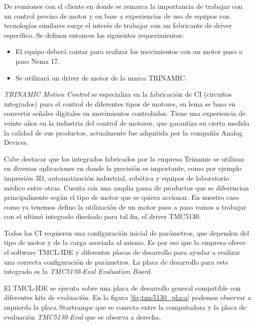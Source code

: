 De reuniones con el cliente en donde se remarca la importancia de trabajar con un control preciso de motor y en base a experiencias de uso de equipos con tecnologías similares surge el interés de trabajar con un fabricante de driver específico. Se definen entonces los siguientes requerimientos:
			
\begin{itemize}
\item El equipo deberá contar para realizar los movimientos con un motor paso a paso Nema 17.
\item Se utilizará un driver de motor de la marca TRINAMIC.
\end{itemize}

\textit{TRINAMIC Motion Control} \citep{3_web_trinamic} se especializa en la fabricación de CI (circuitos integrados) para el control de diferentes tipos de motores, su lema se basa en convertir señales digitales en movimientos controlados. Tiene una experiencia de veinte años en la industria del control de motores, que garantiza en cierta medida la calidad de sus productos, actualmente fue adquirida por la compañía Analog Devices.

Cabe destacar que los integrados fabricados por la empresa Trinamic se utilizan en diversas aplicaciones en donde la precisión es importante, como por ejemplo impresión 3D, automatización industrial, robótica y equipos de laboratorio médico entre otras.
Cuenta con una amplia gama de productos que se diferencian principalmente según el tipo de motor que se quiera accionar. En nuestro caso como ya tenemos defino la utilización de un motor paso a paso vamos a trabajar con el ultimó integrado diseñado para tal fin, el driver TMC5130. 
  
Todos los CI requieren una configuración inicial de parámetros, que dependen del tipo de  motor y de la carga asociada al mismo. Es por eso que la empresa ofrece el software TMCL-IDE  y diferentes placas de desarrollo para ayudar a realizar una correcta configuración de parámetros. La placa de desarrollo para este integrado es la \textit{TMC5130-Eval Evaluation Board}.

El TMCL-IDE se ejecuta sobre una placa de desarrollo general compatible con diferentes kits de evaluación. En la figura \ref{fig:tmc5130_placa} podemos observar a izquierda la placa Startrampe  que se conecta entre la computadora y la placa de evaluación \textit{TMC5130-Eval} que se observa a derecha.

